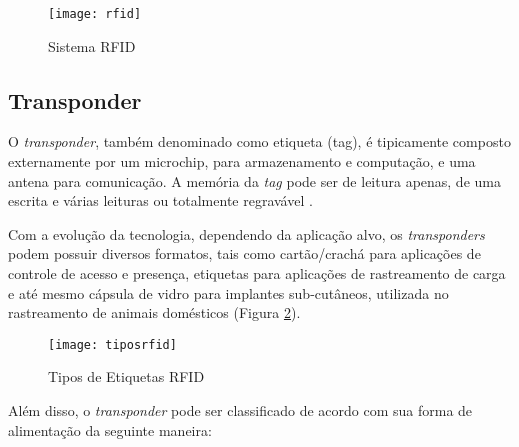 \documentclass[tcc,capa]{texufpel}
\begin{document}
    
        \begin{figure}[H]
            \centering \texttt{[image: rfid]}
            \caption{Sistema RFID \cite{afixgraf:2015:Online}} 
            \label{sistemarfid}
        \end{figure}
    
        \subsection{Transponder}
        
            O \textit{transponder}, também denominado como etiqueta (tag), é tipicamente composto externamente por um microchip, para armazenamento e computação, e uma antena para comunicação. A memória da \textit{tag} pode ser de leitura apenas, de uma escrita e várias leituras ou totalmente regravável \cite{koschan2006radio}. 
            
            Com a evolução da tecnologia, dependendo da aplicação alvo, os \textit{transponders} podem possuir diversos formatos, tais como cartão/crachá para aplicações de controle de acesso e presença, etiquetas para aplicações de rastreamento de carga e até mesmo cápsula de vidro para implantes sub-cutâneos, utilizada no rastreamento de animais domésticos (Figura \ref{etiquetas}).
            
            \begin{figure}[H]
                \centering \texttt{[image: tiposrfid]}
                \caption{Tipos de Etiquetas RFID \cite{coresonant:2015:Online}} 
                \label{etiquetas}
            \end{figure}
            
            Além disso, o \textit{transponder} pode ser classificado de acordo com sua forma de alimentação da seguinte maneira:
            
\end{document}
